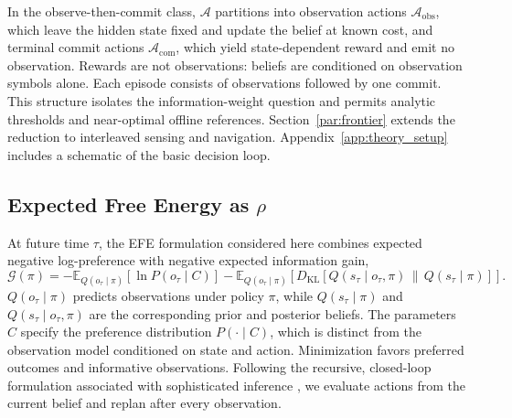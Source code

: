 \documentclass[runningheads]{llncs}
\begin{document}
In the observe-then-commit class, $\mathcal A$ partitions into observation actions $\mathcal A_{\mathrm{obs}}$, which leave the hidden state fixed and update the belief at known cost, and terminal commit actions $\mathcal A_{\mathrm{com}}$, which yield state-dependent reward and emit no observation. Rewards are not observations: beliefs are conditioned on observation symbols alone. Each episode consists of observations followed by one commit. This structure isolates the information-weight question and permits analytic thresholds and near-optimal offline references. Section~\ref{par:frontier} extends the reduction to interleaved sensing and navigation. Appendix~\ref{app:theory_setup} includes a schematic of the basic decision loop.

\subsection{Expected Free Energy as $\rho$}

At future time $\tau$, the EFE formulation considered here combines expected negative log-preference with negative expected information gain,
\begin{equation}
\mathcal G(\pi) = -\mathbb E_{Q(o_\tau\mid\pi)}[\ln P(o_\tau\mid C)]
-\mathbb E_{Q(o_\tau\mid\pi)}\!\left[D_{\mathrm{KL}}\!\left[Q(s_\tau\mid o_\tau,\pi)\,\|\,Q(s_\tau\mid\pi)\right]\right].
\end{equation}
$Q(o_\tau\mid\pi)$ predicts observations under policy $\pi$, while $Q(s_\tau\mid\pi)$ and $Q(s_\tau\mid o_\tau,\pi)$ are the corresponding prior and posterior beliefs. The parameters $C$ specify the preference distribution $P(\cdot\mid C)$, which is distinct from the observation model conditioned on state and action. Minimization favors preferred outcomes and informative observations. Following the recursive, closed-loop formulation associated with sophisticated inference \citep{friston2021,dacosta2020b}, we evaluate actions from the current belief and replan after every observation.
\end{document}
